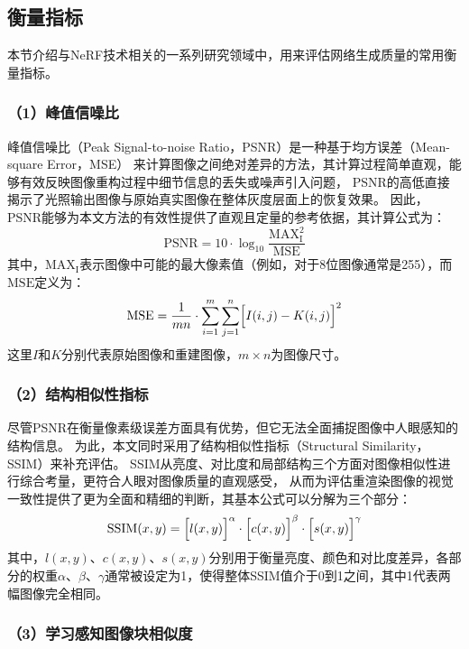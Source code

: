 \subsection{衡量指标}

本节介绍与NeRF技术相关的一系列研究领域中，用来评估网络生成质量的常用衡量指标。

\subsubsection*{（1）峰值信噪比} 

峰值信噪比（Peak Signal-to-noise Ratio，PSNR）是一种基于均方误差（Mean-square Error，MSE）
来计算图像之间绝对差异的方法，其计算过程简单直观，能够有效反映图像重构过程中细节信息的丢失或噪声引入问题，
PSNR的高低直接揭示了光照输出图像与原始真实图像在整体灰度层面上的恢复效果。
因此，PSNR能够为本文方法的有效性提供了直观且定量的参考依据，其计算公式为：
\begin{equation}\label{eq:PSNR}
\mathrm{PSNR}=10\cdot\log_{10}\frac{\mathrm{MAX}_\mathrm{I}^2}{\mathrm{MSE}}
\end{equation}
其中，$\mathrm{MAX}_\mathrm{I}$表示图像中可能的最大像素值（例如，对于8位图像通常是255），而$\mathrm{MSE}$定义为：
\begin{equation}\label{eq:MSE}
\mathrm{MSE}=\frac{1}{mn}\cdot\sum_{i=1}^{m}\sum_{j=1}^{n}\Bigl[I(i,j)-K(i,j)\Bigr]^2
\end{equation}
这里$I$和$K$分别代表原始图像和重建图像，$m\times n$为图像尺寸。

\subsubsection*{（2）结构相似性指标} 

尽管PSNR在衡量像素级误差方面具有优势，但它无法全面捕捉图像中人眼感知的结构信息。
为此，本文同时采用了结构相似性指标（Structural Similarity，SSIM）来补充评估。
SSIM从亮度、对比度和局部结构三个方面对图像相似性进行综合考量，更符合人眼对图像质量的直观感受，
从而为评估重渲染图像的视觉一致性提供了更为全面和精细的判断，其基本公式可以分解为三个部分：
\begin{equation}\label{eq:SSIM}
\mathrm{SSIM}(x,y)=\Bigl[l(x,y)\Bigr]^\alpha\cdot\Bigl[c(x,y)\Bigr]^\beta\cdot\Bigl[s(x,y)\Bigr]^\gamma
\end{equation}
其中，$l(x,y)$、$c(x,y)$、$s(x,y)$分别用于衡量亮度、颜色和对比度差异，各部分的权重$\alpha$、$\beta$、$\gamma$通常被设定为1，使得整体SSIM值介于0到1之间，其中1代表两幅图像完全相同。

\subsubsection*{（3）学习感知图像块相似度} 

